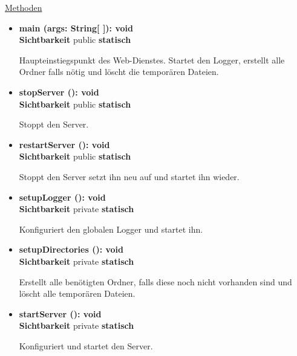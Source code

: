 \underline{Methoden}
\begin{itemize}
\itemsep0pt
\item \textbf{main (args: String[ ]): void}\hfill\\
\textbf{Sichtbarkeit} public \newline
\textbf{statisch}

Haupteinstiegspunkt des Web-Dienstes. Startet den Logger, erstellt alle Ordner falls nötig und löscht die temporären Dateien.

\item \textbf{stopServer (): void}\hfill\\
\textbf{Sichtbarkeit} public \newline
\textbf{statisch}

Stoppt den Server.


\item \textbf{restartServer (): void}\hfill\\
\textbf{Sichtbarkeit} public \newline
\textbf{statisch}

Stoppt den Server setzt ihn neu auf und startet ihn wieder.

\item \textbf{setupLogger (): void}\hfill\\
\textbf{Sichtbarkeit} private \newline
\textbf{statisch}

Konfiguriert den globalen Logger und startet ihn.


\item \textbf{setupDirectories (): void}\hfill\\
\textbf{Sichtbarkeit} private \newline
\textbf{statisch}

Erstellt alle benötigten Ordner, falls diese noch nicht vorhanden sind und löscht alle temporären Dateien.


\item \textbf{startServer (): void}\hfill\\
\textbf{Sichtbarkeit} private \newline
\textbf{statisch}

Konfiguriert und startet den Server.

\end{itemize}